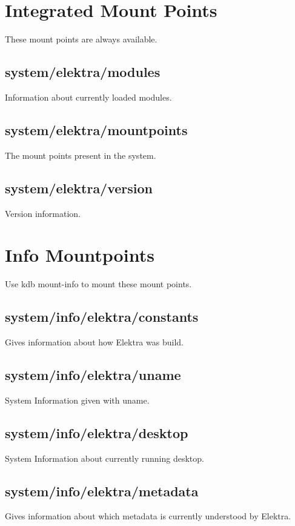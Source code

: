 \hypertarget{doc_help_elektra-hierarchy_md_autotoc_md1694}{}\section{Integrated Mount Points}\label{doc_help_elektra-hierarchy_md_autotoc_md1694}
These mount points are always available.\hypertarget{doc_help_elektra-hierarchy_md_autotoc_md1695}{}\subsection{system/elektra/modules}\label{doc_help_elektra-hierarchy_md_autotoc_md1695}
Information about currently loaded modules.\hypertarget{doc_help_elektra-hierarchy_md_autotoc_md1696}{}\subsection{system/elektra/mountpoints}\label{doc_help_elektra-hierarchy_md_autotoc_md1696}
The mount points present in the system.\hypertarget{doc_help_elektra-hierarchy_md_autotoc_md1697}{}\subsection{system/elektra/version}\label{doc_help_elektra-hierarchy_md_autotoc_md1697}
Version information.\hypertarget{doc_help_elektra-hierarchy_md_autotoc_md1698}{}\section{Info Mountpoints}\label{doc_help_elektra-hierarchy_md_autotoc_md1698}
Use {\ttfamily kdb mount-\/info} to mount these mount points.\hypertarget{doc_help_elektra-hierarchy_md_autotoc_md1699}{}\subsection{system/info/elektra/constants}\label{doc_help_elektra-hierarchy_md_autotoc_md1699}
Gives information about how Elektra was build.\hypertarget{doc_help_elektra-hierarchy_md_autotoc_md1700}{}\subsection{system/info/elektra/uname}\label{doc_help_elektra-hierarchy_md_autotoc_md1700}
System Information given with {\ttfamily uname}.\hypertarget{doc_help_elektra-hierarchy_md_autotoc_md1701}{}\subsection{system/info/elektra/desktop}\label{doc_help_elektra-hierarchy_md_autotoc_md1701}
System Information about currently running desktop.\hypertarget{doc_help_elektra-hierarchy_md_autotoc_md1702}{}\subsection{system/info/elektra/metadata}\label{doc_help_elektra-hierarchy_md_autotoc_md1702}
Gives information about which metadata is currently understood by Elektra.

